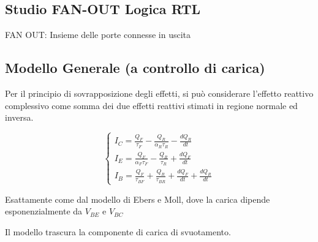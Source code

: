 \documentclass{article}
\begin{document}
\subsection{Studio FAN-OUT Logica RTL}
FAN OUT: Insieme delle porte connesse in uscita

\subsection{Modello Generale (a controllo di carica)}
Per il principio di sovrapposizione degli effetti, si può considerare l'effetto reattivo complessivo come somma dei due effetti reattivi stimati in regione normale ed inversa.

\begin{minipage}{0.5\textwidth}
\begin{center}
\end{center}
\end{minipage}
\begin{minipage}{0.5\textwidth}
\[
    \begin{cases}
        I_C = \frac{Q_F}{\tau_F} -\frac{Q_R}{\alpha_R \tau_R} - \frac{dQ_R}{dt}\\
        I_E = \frac{Q_F}{\alpha_F \tau_F}  - \frac{Q_R}{\tau_R} + \frac{dQ_F}{dt}\\
        I_B = \frac{Q_F}{\tau_{BF}} + \frac{Q_R}{\tau_{BR}} + \frac{dQ_F}{dt} + \frac{dQ_R}{dt}
    \end{cases}
\]
\end{minipage}

\bigbreak%
Esattamente come dal modello di Ebers e Moll, dove la carica dipende esponenzialmente da $V_{BE}$ e $V_{BC}$


Il modello trascura la componente di carica di svuotamento.
\end{document}

